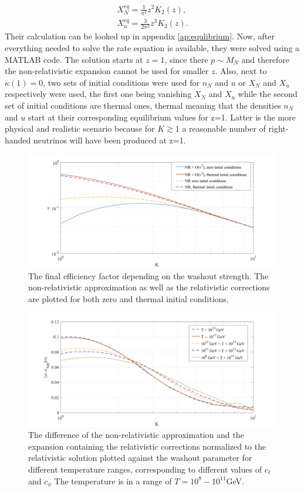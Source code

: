 \begin{align}
	X_N^{eq}=\frac{1}{\pi^2}z^2K_2(z),\\
	X_u^{eq}=\frac{3}{2\pi^2}z^3K_3(z).
\end{align}
Their calculation can be looked up in appendix \ref{ap:equlibrium}.\newline \indent
Now, after everything needed to solve the rate equation is available, they were solved using a MATLAB code. The solution starts at $z=1$, since there $p\sim M_N$ and therefore the non-relativistic expansion cannot be used for smaller $z$\cite[p. 13]{Bodeker:2013qaa}. Also, next to $\kappa(1)=0$, two sets of initial conditions were used for $n_N$ and $u$ or $X_N$ and $X_u$ respectively were used, the first one being vanishing $X_N$ and $X_u$ while the second set of initial conditions are thermal ones, thermal meaning that the densities $n_N$ and $u$ start at their corresponding equilibrium values for z=1. Latter is the more physical and realistic scenario because for $K\gtrsim1$ a reasonable number of right-handed neutrinos will have been produced at z=1\cite[p. 13]{Bodeker:2013qaa}.
\begin{figure}[H]
	\centering
	\includegraphics[width=\linewidth]{Images/efficiency}
	\caption{The final efficiency factor depending on the washout strength. The non-relativistic approximation as well as the relativistic corrections are plotted for both zero and thermal initial conditions.}
	\label{fig:efficiency}
\end{figure}

\begin{figure}[H]
	\centering
	\includegraphics[width=\linewidth]{Images/corrections}
	\caption{The difference of the non-relativistic approximation and the expansion containing the relativistic corrections normalized to the relativistic solution plotted against the washout parameter for different temperature ranges, corresponding to different values of $c_\ell$ and $c_\phi$ The temperature is in a range of $T=10^{8}-10^{11}$GeV.}
	\label{fig:corrections}
\end{figure}

